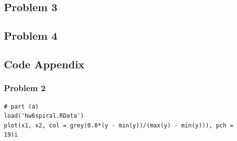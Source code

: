 \documentclass[12pt]{article}
\begin{document}
\subsection*{Problem 3}

\subsection*{Problem 4}

\subsection*{Code Appendix}
\subsubsection*{Problem 2}
\begin{lstlisting}
# part (a)
load('hw6spiral.RData')
plot(x1, x2, col = grey(0.8*(y - min(y))/(max(y) - min(y))), pch = 19)i
\end{lstlisting}


%
%
\end{document}
